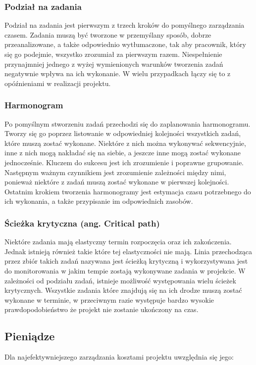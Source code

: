 \documentclass[oneside,polski,logo]{amuthesis}
\begin{document}
\subsubsection {Podział na zadania}
Podział na zadania jest pierwszym z trzech kroków do pomyślnego zarządzania czasem. Zadania muszą być tworzone w przemyślany sposób, dobrze przeanalizowane, a także odpowiednio wytłumaczone, tak aby pracownik, który się go podejmie, wszystko zrozumiał za pierwszym razem. Niespełnienie przynajmniej jednego z wyżej wymienionych warunków tworzenia zadań negatywnie wpływa na ich wykonanie. W wielu przypadkach łączy się to z opóźnieniami w realizacji projektu.

\subsubsection {Harmonogram}
Po pomyślnym stworzeniu zadań przechodzi się do zaplanowania harmonogramu. Tworzy się go poprzez listowanie w odpowiedniej kolejności wszystkich zadań, które muszą zostać wykonane. Niektóre z nich można wykonywać sekwencyjnie, inne z nich mogą nakładać się na siebie, a jeszcze inne mogą zostać wykonane jednocześnie. Kluczem do sukcesu jest ich zrozumienie i poprawne grupowanie. Następnym ważnym czynnikiem jest zrozumienie zależności między nimi, ponieważ niektóre z zadań muszą zostać wykonane w pierwszej kolejności. Ostatnim krokiem tworzenia harmonogramy jest estymacja czasu potrzebnego do ich wykonania, a także przypisanie im odpowiednich zasobów. 

\subsubsection {Ścieżka krytyczna (ang. Critical path)}
Niektóre zadania mają elastyczny termin rozpoczęcia oraz ich zakończenia. Jednak istnieją również takie które tej elastyczności nie mają. Linia przechodząca przez zbiór takich zadań nazywana jest ścieżką krytyczną i wykorzystywana jest do monitorowania w jakim tempie zostają wykonywane zadania w projekcie. W zależności od podziału zadań, istnieje możliwość występowania wielu ścieżek krytycznych. Wszystkie zadania które znajdują się na ich drodze muszą zostać wykonane w terminie, w przeciwnym razie występuje bardzo wysokie prawdopodobieństwo że projekt nie zostanie ukończony na czas.

\subsection {Pieniądze}
Dla najefektywniejszego zarządzania kosztami projektu uwzględnia się jego:
\end{document}

